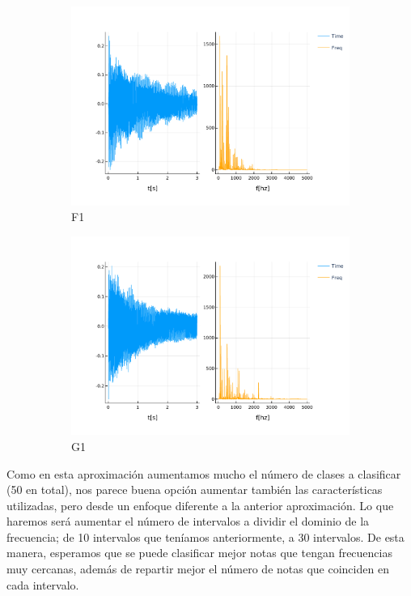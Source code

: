 \documentclass[12pt]{article}
\begin{document}
\begin{figure}[!ht]
	\centering
	\begin{subfigure}{.5\textwidth}
		\centering
		\includegraphics[width=1.0\linewidth]{assets/F1.pdf}
		\caption{F1}
		\label{fig:f1}
	\end{subfigure}%
	\begin{subfigure}{.5\textwidth}
		\centering
		\includegraphics[width=1.0\linewidth]{assets/G1.pdf}
		\caption{G1}
		\label{fig:g1}
	\end{subfigure}
	\caption{}
\end{figure}

\bigskip
Como en esta aproximación aumentamos mucho el número de clases a clasificar (50 en total),
nos parece buena opción aumentar también las características utilizadas, pero desde un enfoque
diferente a la anterior aproximación. Lo que haremos será aumentar el número de intervalos
a dividir el dominio de la frecuencia; de 10 intervalos que teníamos anteriormente, a 30 intervalos.
De esta manera, esperamos que se puede clasificar mejor notas que tengan frecuencias muy cercanas,
además de repartir mejor el número de notas que coinciden en cada intervalo.
\end{document}
